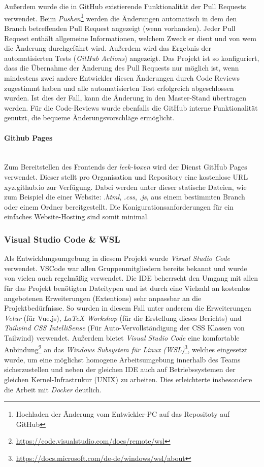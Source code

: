 \documentclass[10pt, a4paper]{article}
\begin{document}
\\~\\
Außerdem wurde die in GitHub existierende Funktionalität der Pull Requests verwendet. Beim \textit{Pushen}\footnote{Hochladen der Änderung vom Entwickler-PC auf das Repositoty auf GitHub}
werden die Änderungen automatisch in dem den Branch betreffenden Pull Request angezeigt (wenn vorhanden).
Jeder Pull Request enthält allgemeine Informationen, welchem Zweck er dient und von wem die Änderung durchgeführt wird. Außerdem wird das Ergebnis der automatisierten Tests (\textit{GitHub Actions}) angezeigt.
Das Projekt ist so konfiguriert, dass die Übernahme der Änderung des Pull Requests nur möglich ist, wenn mindestens zwei andere Entwickler diesen Änderungen
durch Code Reviews zugestimmt haben und alle automatisierten Test erfolgreich abgeschlossen wurden. Ist dies der Fall, kann die Änderung in den Master-Stand übertragen werden.
Für die Code-Reviews wurde ebenfalls die GitHub interne Funktionalität genutzt, die bequeme Änderungsvorschläge ermöglicht.

\paragraph{Github Pages} $~$ \\
Zum Bereitstellen des Frontends der \textit{leek-boxen} wird der Dienst GitHub Pages verwendet. Dieser stellt pro Organisation und Repository eine kostenlose URL xyz.github.io zur Verfügung.
Dabei werden unter dieser statische Dateien, wie zum Beispiel die einer Website: \textit{.html}, \textit{.css}, \textit{.js}, aus einem bestimmten Branch oder einem Ordner bereitgestellt.
Die Konigurationsanforderungen für ein einfaches Website-Hosting sind somit minimal.

\subsubsection{Visual Studio Code \& WSL}
Als Entwicklungsumgebung in diesem Projekt wurde \textit{Visual Studio Code} verwendet. VSCode war allen Gruppenmitgliedern bereits bekannt und wurde von vielen auch regelmäßig verwendet.
Die IDE beherrscht den Umgang mit allen für das Projekt benötigten Dateitypen und ist durch eine Vielzahl an kostenlos angebotenen Erweiterungen (Extentions) sehr anpassbar an die Projektbedürfnisse.
So wurden in diesem Fall unter anderem die Erweiterungen \textit{Vetur} (für Vue.js), \textit{LaTeX Workshop}  (für die Erstellung dieses Berichts) und \textit{Tailwind CSS IntelliSense} (Für Auto-Vervollständigung der CSS Klassen von Tailwind) verwendet.
Außerdem bietet \textit{Visual Studio Code} eine komfortable Anbindung\footnote{\raggedright\url{https://code.visualstudio.com/docs/remote/wsl}} an das
\textit{Windows Subsystem für Linux (WSL)}\footnote{\raggedright\url{https://docs.microsoft.com/de-de/windows/wsl/about}}, welches eingesetzt wurde, um eine möglichst homogene Arbeitsumgebung innerhalb des Teams sicherzustellen
und neben der gleichen IDE auch auf Betriebssystemen der gleichen Kernel-Infrastrukur (UNIX) zu arbeiten. Dies erleichterte insbesondere die Arbeit mit \textit{Docker} deutlich.
\end{document}

